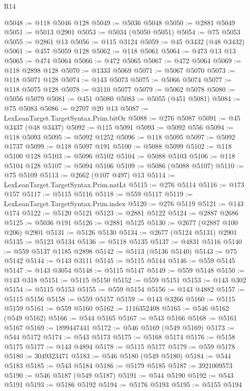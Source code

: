\begin{lexlean}{R14}
\begin{coremodule}
@5048 := @118 @5046 @128
@5049 := @5036 @5048
@5050 := @2881 @5049
@5051 := @5013 @2901
@5053 := @5034 (@5050 @5051)
@5054 := @75 @5053
@5055 := @2861 @13
@5056 := @115 @3124
@5059 := @45 @3432 (@48 @3432)
@5061 := @457 @5059 @128
@5062 := @118 @5061
@5064 := @473 @13 @13
@5065 := @474 @5064
@5066 := @472 @5065
@5067 := @472 @5064
@5069 := @118 @2898 @128
@5070 := @1333 @5069
@5071 := @5067 @5070
@5073 := @118 @5071 @128
@5074 := @143 @5073
@5075 := @5066 @5074
@5077 := @118 @5075 @128
@5078 := @3110 @5077
@5079 := @5062 @5078
@5080 := @5056 @5079
@5081 := @451 @5080
@5083 := @5055 (@451 @5081)
@5084 := @75 @5083
@5086 := @2707 @20 @13
@5087 := LexLeanTarget.TargetSyntax.Prim.bitOr
@5088 := @276 @5087
@5091 := @45 @3437 (@48 @3437)
@5092 := @115 @5091
@5093 := @5092 @556
@5094 := @118 @5093
@5095 := @5092 @1252
@5096 := @118 @5095
@5097 := @5092 @1737
@5099 := @118 @5097 @191
@5100 := @5088 @5099
@5102 := @118 @5100 @128
@5103 := @5096 @5102
@5104 := @5088 @5103
@5106 := @118 @5104 @128
@5107 := @5094 @5106
@5109 := @5086 (@5088 @5107)
@5110 := @75 @5109
@5113 := @2662 (@107 @497) @13
@5114 := LexLeanTarget.TargetSyntax.Prim.natLt
@5115 := @276 @5114
@5116 := @173 @157
@5117 := @5115 @5116
@5118 := @559 @5117
@5119 := LexLeanTarget.TargetSyntax.Prim.index
@5120 := @276 @5119
@5121 := @143 @174
@5122 := @5120 @5121
@5123 := @2881 @5122
@5124 := @2887 @2686
@5125 := @5036 @191
@5126 := @2881 @5125
@5130 := @2677 (@2887 @100 @206) @2901
@5131 := @5126 @5130
@5134 := @2677 (@5124 @5131) @2901
@5135 := @5123 @5134
@5136 := @5118 @5135
@5137 := @4831 @5116
@5140 := @559 @5137 @1185 @2898
@5142 := @5113 (@5136 @5140)
@5143 := @75 @5142
@5144 := @143 @3111
@5145 := @5115 @5144
@5146 := @559 @5145
@5147 := @143 @3054
@5148 := @5115 @5147
@5149 := @559 @5148
@5150 := @143 @318
@5151 := @5115 @5150
@5152 := @559 @5151
@5153 := @143 @302
@5154 := @5115 @5153
@5155 := @559 @5154
@5156 := @143 @4882
@5157 := @5115 @5156
@5158 := @559 @5157
@5159 := @143 @3266
@5160 := @5115 @5159
@5161 := @559 @5160
@5162 := 1116352408
@5165 := @546 @5162 (@549 @5162)
@5166 := @544 @5165
@5167 := @543 @5166
@5168 := @5161 @5167
@5169 := 1899447441
@5172 := @546 @5169 (@549 @5169)
@5173 := @544 @5172
@5174 := @543 @5173
@5175 := @5168 @5174
@5176 := @5158 @5175
@5177 := @143 @4894
@5178 := @5115 @5177
@5179 := @559 @5178
@5180 := 3049323471
@5183 := @546 @5180 (@549 @5180)
@5184 := @544 @5183
@5185 := @543 @5184
@5186 := @5179 @5185
@5187 := 3921009573
@5190 := @546 @5187 (@549 @5187)
@5191 := @544 @5190
@5192 := @543 @5191
@5193 := @5186 @5192
@5194 := @5176 @5193
@5195 := @5155 @5194

\end{coremodule}
\end{lexlean}
